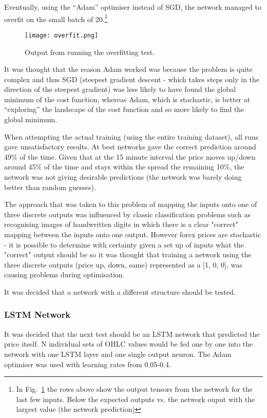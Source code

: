             Eventually, using the “Adam” optimiser instead of SGD, the network managed to overfit on the small batch of 20.\footnote{In Fig.~\ref{fig:Overfit} the rows above show the output tensors from the network for the last few inputs. Below the expected outputs vs. the network ouput with the largest value (the network prediction)}

            \begin{figure}[h]
                \centering
                \texttt{[image: overfit.png]}
                \caption{Output from running the overfitting test.}
                \label{fig:Overfit}
            \end{figure}
            

            It was thought that the reason Adam worked was because the problem is quite complex and thus SGD (steepest gradient descent - which takes steps only in the direction of the steepest gradient) was less likely to have found the global minimum of the cost function, whereas Adam, which is stochastic, is better at “exploring” the landscape of the cost function and so more likely to find the global minimum.

            When attempting the actual training (using the entire training dataset), all runs gave unsatisfactory results. At best networks gave the correct prediction around 49\% of the time. Given that at the 15 minute interval the price moves up/down around 45\% of the time and stays within the spread the remaining 10\%, the network was not giving desirable predictions (the network was barely doing better than random guesses).

            The approach that was taken to this problem of mapping the inputs onto one of three discrete outputs was influenced by classic classification problems such as recognising images of handwritten digits in which there is a clear "correct" mapping between the inputs onto one output. However forex prices are stochastic - it is possible to determine with certainty given a set up of inputs what the "correct" output should be so it was thought that training a network using the three discrete outputs (price up, down, same) represented as a [1, 0, 0], was causing problems during optimisation.

            It was decided that a network with a different structure should be tested.


            \subsubsection{LSTM Network}
            It was decided that the next test should be an LSTM network that predicted the price itself. N individual sets of OHLC values would be fed one by one into the network with one LSTM layer and one single output neuron. The Adam optimiser was used with learning rates from 0.05-0.4.

